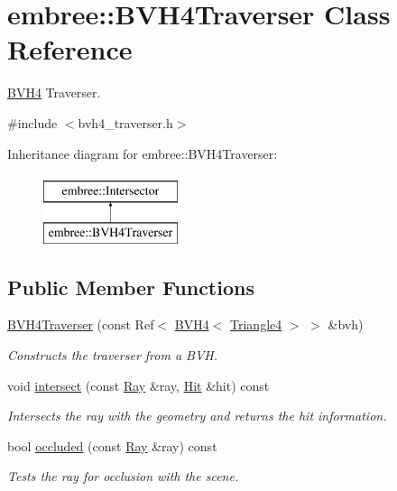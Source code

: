\hypertarget{classembree_1_1_b_v_h4_traverser}{
\section{embree::BVH4Traverser Class Reference}
\label{classembree_1_1_b_v_h4_traverser}
}


\hyperlink{classembree_1_1_b_v_h4}{BVH4} Traverser.  




{\ttfamily \#include $<$bvh4\_\-traverser.h$>$}

Inheritance diagram for embree::BVH4Traverser:\begin{figure}[H]
\begin{center}
\leavevmode
\includegraphics[height=2.000000cm]{classembree_1_1_b_v_h4_traverser}
\end{center}
\end{figure}
\subsection*{Public Member Functions}
\begin{DoxyCompactItemize}
\item 
\hyperlink{classembree_1_1_b_v_h4_traverser_a98ca127f4925cffb63315c514e251b0e}{BVH4Traverser} (const Ref$<$ \hyperlink{classembree_1_1_b_v_h4}{BVH4}$<$ \hyperlink{structembree_1_1_triangle4}{Triangle4} $>$ $>$ \&bvh)
\begin{DoxyCompactList}\small\item\em Constructs the traverser from a BVH. \item\end{DoxyCompactList}\item 
void \hyperlink{classembree_1_1_b_v_h4_traverser_ad7a096791c029d3bb8e3d925785fa52f}{intersect} (const \hyperlink{structembree_1_1_ray}{Ray} \&ray, \hyperlink{structembree_1_1_hit}{Hit} \&hit) const 
\begin{DoxyCompactList}\small\item\em Intersects the ray with the geometry and returns the hit information. \item\end{DoxyCompactList}\item 
bool \hyperlink{classembree_1_1_b_v_h4_traverser_ab008fbe9dd78c3f2c960554052804657}{occluded} (const \hyperlink{structembree_1_1_ray}{Ray} \&ray) const 
\begin{DoxyCompactList}\small\item\em Tests the ray for occlusion with the scene. \item\end{DoxyCompactList}\end{DoxyCompactItemize}


